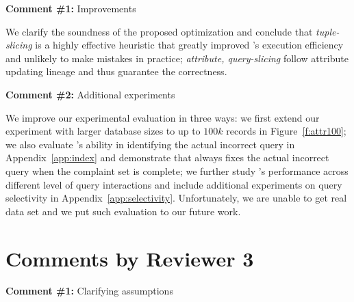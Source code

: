 

\noindent
\textbf{Comment \#1:} Improvements
\begin{quote}
\end{quote}

We clarify the soundness of the proposed optimization and conclude that
\emph{tuple-slicing} is a highly effective heuristic that greatly improved
\sys's execution efficiency and unlikely to make mistakes in practice;
\emph{attribute, query-slicing} follow attribute updating lineage and thus
guarantee the correctness.

\comskip

\noindent
\textbf{Comment \#2:} Additional experiments
\begin{quote}
\end{quote}

We improve our experimental evaluation in three ways: we first extend our
experiment with larger database sizes to up to $100k$ records in
Figure~\ref{f:attr100}; we also evaluate \sys's ability in identifying the
actual incorrect query in Appendix~\ref{app:index} and demonstrate that \sys
always fixes the actual incorrect query when the complaint set is complete; we
further study \sys's performance across different level of query interactions
and include additional experiments on query selectivity in
Appendix~\ref{app:selectivity}. Unfortunately, we are unable to get real data
set and we put such evaluation to our future work.



\section*{Comments by Reviewer 3}

\noindent
\textbf{Comment \#1:} Clarifying assumptions
\begin{quote}
\end{quote}

